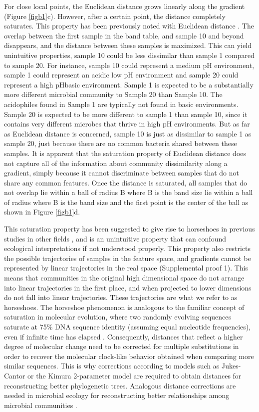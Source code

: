For close local points, the Euclidean distance grows linearly along the gradient (Figure \ref{figb1}c).  However, after a certain point, the distance completely saturates. This property has been previously noted with Euclidean distance \cite{detrended_correspondence_analysis}.  The overlap between the first sample in the band table, and sample 10 and beyond disappears, and the distance between these samples is maximized. This can yield unintuitive properties, sample 10 could be less dissimilar than sample 1 compared to sample 20.  For instance, sample 10 could represent a medium pH environment, sample 1 could represent an acidic low pH environment and sample 20 could represent a high pHbasic environment. Sample 1 is expected to be a substantially more different microbial community to Sample 20 than Sample 10.  The acidophiles found in Sample 1 are typically not found in basic environments. Sample 20 is expected to be more different to sample 1 than sample 10, since it contains very different microbes that thrive in high pH environments.  But as far as Euclidean distance is concerned, sample 10 is just as dissimilar to sample 1 as sample 20, just because there are no common bacteria shared between these samples.  It is apparent that the saturation property of Euclidean distance does not capture all of the information about community dissimilarity along a gradient, simply because it cannot discriminate between samples that do not share any common features.  Once the distance is saturated, all samples that do not overlap lie within a ball of radius B where B is the band size lie within a ball of radius where B is the band size and the first point is the center of the ball as shown in Figure \ref{figb1}d.\par
This saturation property has been suggested to give rise to horseshoes in previous studies in other fields \cite{horseshoe_kernel}, and is an unintuitive property that can confound ecological interpretations if not understood properly.  This property also restricts the possible trajectories of samples in the feature space, and gradients cannot be represented by linear trajectories in the real space (Supplemental proof 1). This means that communities in the original high dimensional space do not arrange into linear trajectories in the first place, and when projected to lower dimensions do not fall into linear trajectories.  These trajectories are what we refer to as horseshoes.  The horseshoe phenomenon is analogous to the familiar concept of saturation in molecular evolution, where two randomly evolving sequences saturate at 75\% DNA sequence identity (assuming equal nucleotide frequencies), even if infinite time has elapsed \cite{dna_saturation}. Consequently, distances that reflect a higher degree of molecular change need to be corrected for multiple substitutions in order to recover the molecular clock-like behavior obtained when comparing more similar sequences. This is why corrections according to models such as Jukes-Cantor or the Kimura 2-parameter model are required to obtain distances for reconstructing better phylogenetic trees. Analogous distance corrections are needed in microbial ecology for reconstructing better relationships among microbial communities \cite{evolutionary_distances}.\par
